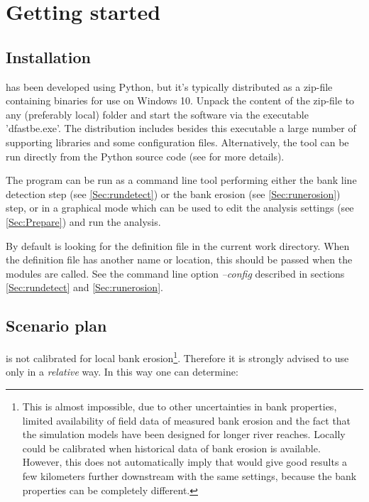 \chapter{Getting started} \label{Chp:GetStarted}

\section{Installation}

\dfastbe has been developed using Python, but it's typically distributed as a zip-file containing binaries for use on Windows 10.
Unpack the content of the zip-file to any (preferably local) folder and start the software via the executable 'dfastbe.exe'.
The distribution includes besides this executable a large number of supporting libraries and some configuration files.
Alternatively, the tool can be run directly from the Python source code (see  for more details).

The program can be run as a command line tool performing either the bank line detection step (see \autoref{Sec:rundetect}) or the bank erosion (see \autoref{Sec:runerosion}) step, or in a graphical mode which can be used to edit the analysis settings (see \autoref{Sec:Prepare}) and run the analysis.

By default \dfastbe is looking for the definition file  in the current work directory.
When the definition file has another name or location, this should be passed when the modules are called.
See the command line option \emph{--config} described in sections \ref{Sec:rundetect} and \ref{Sec:runerosion}.

\section{Scenario plan}

\dfastbe is not calibrated for local bank erosion\footnote{This is almost impossible, due to other uncertainties in bank properties, limited availability of field data of measured bank erosion and the fact that the simulation models have been designed for longer river reaches.
Locally \dfastbe could be calibrated when historical data of bank erosion is available.
However, this does not automatically imply that \dfastbe would give good results a few kilometers further downstream with the same settings, because the bank properties can be completely different.}.
Therefore it is strongly advised to use \dfastbe only in a \emph{relative} way.
In this way one can determine:

